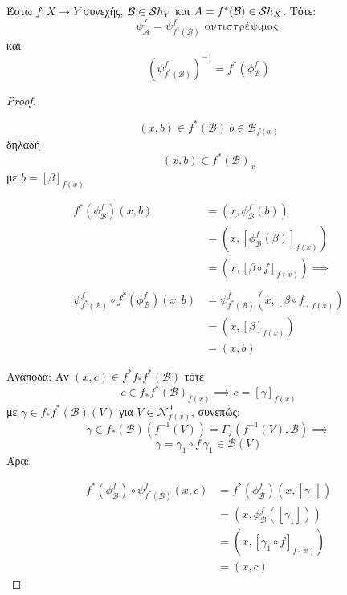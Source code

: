 \begin{lemma} Έστω $f:X\longrightarrow Y$ συνεχής, $\mathcal{B} \in \mathcal{S} h_Y$ και $A = f^*(\mathcal{B}) \in \mathcal{S} h_X$. Τότε:
    $$\psi^f_{\mathcal{A}} = \psi^f_{f^*(\mathcal{B})} \text{ αντιστρέψιμος }$$ και 
    $$\left(\psi^f_{f^*(\mathcal{B})}\right)^{-1} = f^*(\phi^f_{\mathcal{B}})$$
\end{lemma}

\begin{proof}
    \begin{figure}[H]
        \centering
    \end{figure}

    $$(x,b) \in f^*(\mathcal{B}) \ b \in \mathcal{B}_{f(x)}$$ δηλαδή 
    $$(x,b) \in f^*(\mathcal{B})_x$$ με $b = [\beta]_{f(x)}$

    \begin{align*}
        f^*(\phi^f_{\mathcal{B}})(x,b) &= (x,\phi^f_{\mathcal{B}}(b)) \\
        &= (x, [\phi^f_{\mathcal{B}}(\beta)]_{f(x)}) \\
        &= (x, [\beta \circ f]_{f(x)})  \implies \\
        \\
        \psi^f_{f^*(\mathcal{B})} \circ f^*(\phi^f_{\mathcal{B}})(x,b) &= \psi^f_{f^*(\mathcal{B})}(x,[\beta\circ f]_{f(x)}) \\
        &= (x,[\beta]_{f(x)}) \\
        &= (x,b)
    \end{align*}

    \noindent Ανάποδα: Αν $(x,c) \in f^*f_*f^*(\mathcal{B})$ τότε
    $$c \in f_*f^*(\mathcal{B})_{f(x)} \implies c = [\gamma]_{f(x)}$$ με $\gamma \in f_*f^*(\mathcal{B})(V)$ για $V \in \mathcal{N}^0_{f(x)}$, συνεπώς:
    $$\gamma \in f_*(\mathcal{B})(f^{-1}(V)) = \Gamma_f (f^{-1}(V),\mathcal{B}) \implies $$
    $$\gamma = \gamma_1 \circ f \ \gamma_1 \in \mathcal B(V)$$ Άρα:

    \begin{align*}
        f^*(\phi^f_{\mathcal{B}})\circ \psi^f_{f^*(\mathcal{B})} (x,c) & = f^*(\phi^f_{\mathcal{B}})(x,[\gamma_1]) \\
        &= (x,\phi^f_{\mathcal{B}}([\gamma_1])) \\
        &= (x,[\gamma_1 \circ f]_{f(x)}) \\
        &= (x,c)
    \end{align*}
\end{proof}

